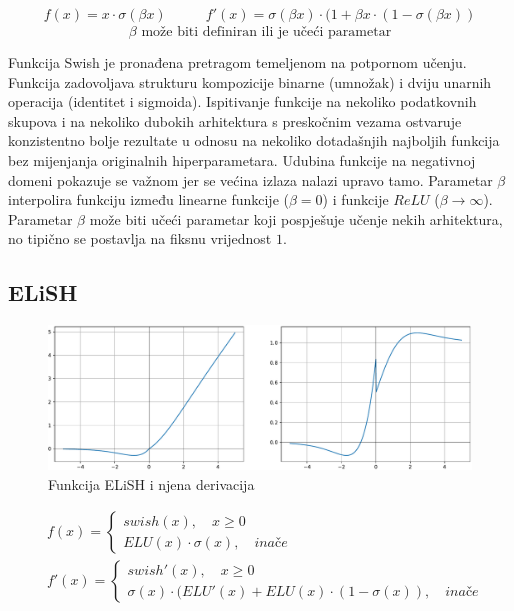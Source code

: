 \documentclass[times, utf8, numeric, diplomski]{fer}
\def\otherwise{\textit{inače}}
\begin{document}
\begin{equation}
\label{eq:swish}
\begin{split}
f(x) = x \cdot \sigma(\beta x)
\end{split}
\qquad
\begin{split}
f'(x) = \sigma(\beta x) \cdot (1 + \beta x \cdot (1-\sigma(\beta x))
\end{split}
\end{equation}
\begin{equation*}
\beta \text{ može biti definiran ili je učeći parametar}
\end{equation*}

Funkcija Swish je pronađena pretragom temeljenom na potpornom učenju. Funkcija zadovoljava strukturu kompozicije binarne (umnožak) i dviju unarnih operacija (identitet i sigmoida). Ispitivanje funkcije na nekoliko podatkovnih skupova i na nekoliko dubokih arhitektura s preskočnim vezama ostvaruje konzistentno bolje rezultate u odnosu na nekoliko dotadašnjih najboljih funkcija bez mijenjanja originalnih hiperparametara. Udubina funkcije na negativnoj domeni pokazuje se važnom jer se većina izlaza nalazi upravo tamo. Parametar $\beta$ interpolira funkciju između linearne funkcije ($\beta=0$) i funkcije $ReLU$ ($\beta \rightarrow \infty$). Parametar $\beta$ može biti učeći parametar koji pospješuje učenje nekih arhitektura, no tipično se postavlja na fiksnu vrijednost $1$. \citep{swish}

\subsection{ELiSH}
\label{func:elish}

\begin{figure}[H]
\includegraphics[width=\textwidth]{func_ELiSH.pdf}
\centering
\caption{Funkcija ELiSH i njena derivacija}
\label{fig:elish}
\end{figure}

\begin{equation}
\begin{split}
&f(x) = 
	\begin{cases}
		swish(x), \quad x \geq 0 \\
		ELU(x) \cdot \sigma(x), \quad \otherwise
	\end{cases} \\
&f'(x) =
	\begin{cases}
		swish'(x), \quad x \geq 0 \\
		\sigma(x) \cdot (ELU'(x) + ELU(x) \cdot (1-\sigma(x)), \quad \otherwise
	\end{cases}
\end{split}
\end{equation}
\end{document}
